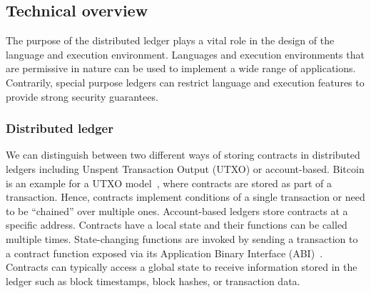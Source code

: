 

\subsection{Technical overview}
The purpose of the distributed ledger plays a vital role in the design of the language and execution environment.
Languages and execution environments that are permissive in nature can be used to implement a wide range of applications. 
Contrarily, special purpose ledgers can restrict language and execution features to provide strong security guarantees.

\subsubsection{Distributed ledger}
We can distinguish between two different ways of storing contracts in distributed ledgers including Unspent Transaction Output (UTXO) or account-based.
Bitcoin is an example for a UTXO model~\cite{Nakamoto2008,Covaci2018}, where contracts are stored as part of a transaction. %
Hence, contracts implement conditions of a single transaction or need to be ``chained'' over multiple ones.
Account-based ledgers store contracts at a specific address.
Contracts have a local state and their functions can be called multiple times.
State-changing functions are invoked by sending a transaction to a contract function exposed via its Application Binary Interface (ABI)~\cite{Wood2014,Sergey2018,OCamlProSAS2018}.
Contracts can typically access a global state to receive information stored in the ledger such as block timestamps, block hashes, or transaction data. 

